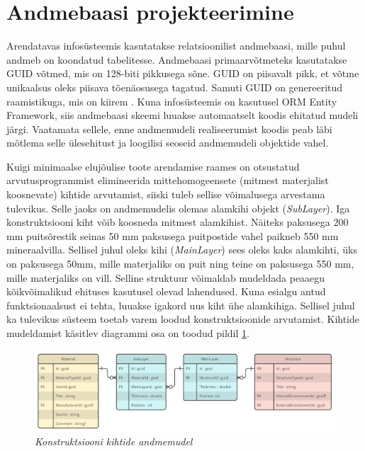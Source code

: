 \section{Andmebaasi projekteerimine}
Arendatavas infosüsteemis kasutatakse relatsioonilist andmebaasi, mille puhul andmeb on koondatud
tabelitesse. 
Andmebaasi primaarvõtmeteks kasutatakse GUID võtmed, mis on 128-biti pikkusega sõne.
GUID on piisavalt pikk, et võtme unikaalsus oleks piisava tõenäosusega tagatud. Samuti GUID on genereeritud
raamistikuga, mis on kiirem \cite{guid_definition}. Kuna infosüsteemis on kasutusel ORM Entity Framework, 
siis andmebaasi skeemi luuakse automaatselt koodis ehitatud mudeli järgi. Vaatamata sellele, enne 
andmemudeli realiseerumist koodis peab läbi mõtlema selle ülesehitust ja loogilisi seoseid andmemudeli
objektide vahel.

Kuigi minimaalse elujõulise toote arendamise raames on otsustatud arvutusprogrammist elimineerida mittehomogeensete
(mitmest materjalist koosnevate) kihtide arvutamist, siiski tuleb sellise võimalusega arvestama tulevikus. Selle jaoks on andmemudelis 
olemas alamkihi objekt (\textit{SubLayer}). Iga konstruktsiooni kiht võib koosneda mitmest alamkihist.
Näiteks paksusega 200 mm puitsõrestik seinas 50 mm paksusega puitpostide vahel paikneb 550 mm mineraalvilla. 
Sellisel juhul oleks kihi (\textit{MainLayer}) sees oleks kaks alamkihti, üks on paksusega 50mm, mille materjaliks
on puit ning teine on paksusega 550 mm, mille materjaliks on vill. Selline struktuur võimaldab mudeldada
peaaegu kõikvõimalikud ehituses kasutusel olevad lahendused. Kuna esialgu antud funktsionaalsust
ei tehta, luuakse igakord uus kiht ühe alamkihiga. Sellisel juhul ka tulevikus süsteem toetab varem loodud
konstruktsioonide arvutamist. Kihtide mudeldamist käsitlev diagrammi osa on toodud pildil \ref{fig:db_layers_model}.

\begin{figure}[ht]
    \centering
    \includegraphics[width=1\textwidth]{figures/analysis/db_desing_1.png}
    \caption[Konstruktsiooni kihtide andmemudel]{\textit{Konstruktsiooni kihtide andmemudel}}
    \label{fig:db_layers_model}
\end{figure}

